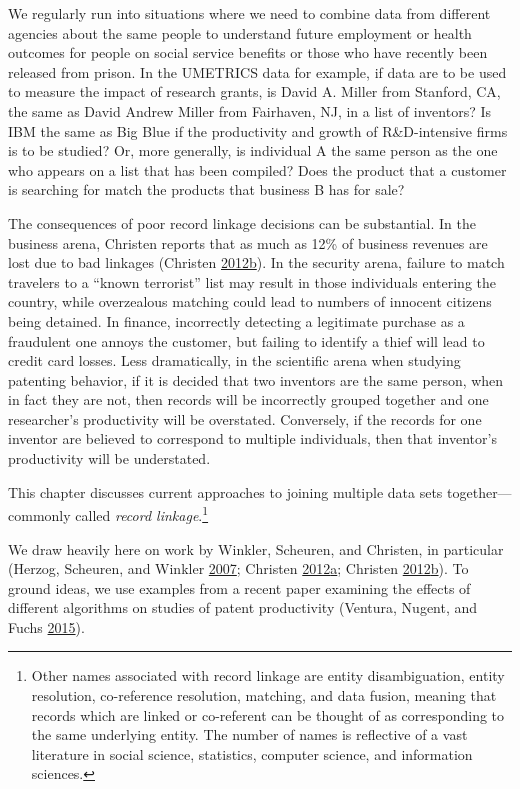 \documentclass[]{krantz}
\begin{document}
We regularly run into situations where we need to combine data from
different agencies about the same people to understand future employment
or health outcomes for people on social service benefits or those who
have recently been released from prison. In the UMETRICS data for
example, if data are to be used to measure the impact of research
grants, is David A. Miller from Stanford, CA, the same as David Andrew
Miller from Fairhaven, NJ, in a list of inventors? Is IBM the same as
Big Blue if the productivity and growth of R\&D-intensive firms is to be
studied? Or, more generally, is individual A the same person as the one
who appears on a list that has been compiled? Does the product that a
customer is searching for match the products that business B has for
sale?

The consequences of poor record linkage decisions can be substantial. In
the business arena, Christen reports that as much as 12\% of business
revenues are lost due to bad linkages (Christen
\protect\hyperlink{ref-christen2012data}{2012}\protect\hyperlink{ref-christen2012data}{b}).
In the security arena, failure to match travelers to a ``known
terrorist'' list may result in those individuals entering the country,
while overzealous matching could lead to numbers of innocent citizens
being detained. In finance, incorrectly detecting a legitimate purchase
as a fraudulent one annoys the customer, but failing to identify a thief
will lead to credit card losses. Less dramatically, in the scientific
arena when studying patenting behavior, if it is decided that two
inventors are the same person, when in fact they are not, then records
will be incorrectly grouped together and one researcher's productivity
will be overstated. Conversely, if the records for one inventor are
believed to correspond to multiple individuals, then that inventor's
productivity will be understated.

This chapter discusses current approaches to joining multiple data sets
together---commonly called \emph{record linkage}.\footnote{Other names
  associated with record linkage are entity disambiguation, entity
  resolution, co-reference resolution, matching, and data fusion,
  meaning that records which are linked or co-referent can be thought of
  as corresponding to the same underlying entity. The number of names is
  reflective of a vast literature in social science, statistics,
  computer science, and information sciences.}

We draw heavily here on work by Winkler, Scheuren, and Christen, in
particular (Herzog, Scheuren, and Winkler
\protect\hyperlink{ref-herzog2007data}{2007}; Christen
\protect\hyperlink{ref-christen2012survey}{2012}\protect\hyperlink{ref-christen2012survey}{a};
Christen
\protect\hyperlink{ref-christen2012data}{2012}\protect\hyperlink{ref-christen2012data}{b}).
To ground ideas, we use examples from a recent paper examining the
effects of different algorithms on studies of patent productivity
(Ventura, Nugent, and Fuchs
\protect\hyperlink{ref-ventura2015seeing}{2015}).
\end{document}
